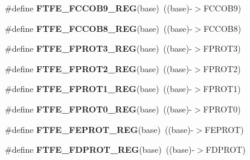 \begin{DoxyCompactItemize}
\item 
\#define {\bfseries F\+T\+F\+E\+\_\+\+F\+C\+C\+O\+B9\+\_\+\+R\+EG}(base)~((base)-\/$>$F\+C\+C\+O\+B9)\hypertarget{group__FTFE__Register__Accessor__Macros_gaf6f55c2b4d0ba68f354b31b30e3757f5}{}\label{group__FTFE__Register__Accessor__Macros_gaf6f55c2b4d0ba68f354b31b30e3757f5}

\item 
\#define {\bfseries F\+T\+F\+E\+\_\+\+F\+C\+C\+O\+B8\+\_\+\+R\+EG}(base)~((base)-\/$>$F\+C\+C\+O\+B8)\hypertarget{group__FTFE__Register__Accessor__Macros_gae0790024976a051b793b3cc22fd2d8f4}{}\label{group__FTFE__Register__Accessor__Macros_gae0790024976a051b793b3cc22fd2d8f4}

\item 
\#define {\bfseries F\+T\+F\+E\+\_\+\+F\+P\+R\+O\+T3\+\_\+\+R\+EG}(base)~((base)-\/$>$F\+P\+R\+O\+T3)\hypertarget{group__FTFE__Register__Accessor__Macros_ga42160955dbea737acb10e834ead4e911}{}\label{group__FTFE__Register__Accessor__Macros_ga42160955dbea737acb10e834ead4e911}

\item 
\#define {\bfseries F\+T\+F\+E\+\_\+\+F\+P\+R\+O\+T2\+\_\+\+R\+EG}(base)~((base)-\/$>$F\+P\+R\+O\+T2)\hypertarget{group__FTFE__Register__Accessor__Macros_ga7aec6eb359a86e456cd6de28dbab6659}{}\label{group__FTFE__Register__Accessor__Macros_ga7aec6eb359a86e456cd6de28dbab6659}

\item 
\#define {\bfseries F\+T\+F\+E\+\_\+\+F\+P\+R\+O\+T1\+\_\+\+R\+EG}(base)~((base)-\/$>$F\+P\+R\+O\+T1)\hypertarget{group__FTFE__Register__Accessor__Macros_ga9147ed52d0357f7bdb91d136b8c06838}{}\label{group__FTFE__Register__Accessor__Macros_ga9147ed52d0357f7bdb91d136b8c06838}

\item 
\#define {\bfseries F\+T\+F\+E\+\_\+\+F\+P\+R\+O\+T0\+\_\+\+R\+EG}(base)~((base)-\/$>$F\+P\+R\+O\+T0)\hypertarget{group__FTFE__Register__Accessor__Macros_ga7024bf9d1e8cf1398f67d78d1be555d1}{}\label{group__FTFE__Register__Accessor__Macros_ga7024bf9d1e8cf1398f67d78d1be555d1}

\item 
\#define {\bfseries F\+T\+F\+E\+\_\+\+F\+E\+P\+R\+O\+T\+\_\+\+R\+EG}(base)~((base)-\/$>$F\+E\+P\+R\+OT)\hypertarget{group__FTFE__Register__Accessor__Macros_gae47caafc6c1db5110ff9f1d11044b472}{}\label{group__FTFE__Register__Accessor__Macros_gae47caafc6c1db5110ff9f1d11044b472}

\item 
\#define {\bfseries F\+T\+F\+E\+\_\+\+F\+D\+P\+R\+O\+T\+\_\+\+R\+EG}(base)~((base)-\/$>$F\+D\+P\+R\+OT)\hypertarget{group__FTFE__Register__Accessor__Macros_gad73728d39d9904529c5a0bbc502587e1}{}\label{group__FTFE__Register__Accessor__Macros_gad73728d39d9904529c5a0bbc502587e1}


\end{DoxyCompactItemize}
